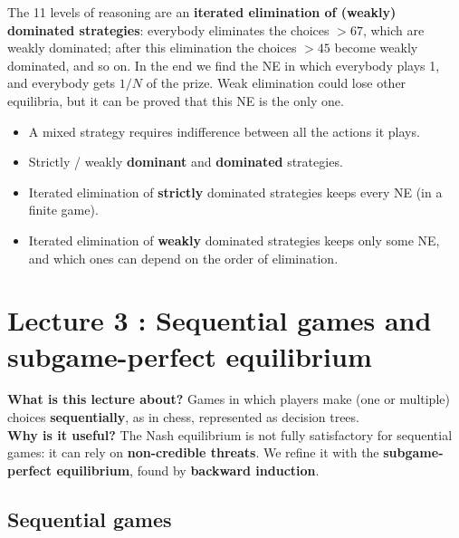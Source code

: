 \documentclass[11pt,a4paper,openany]{book}
\begin{document}
\begin{propbox}[title=Beauty Contest and iterated elimination]
The 11 levels of reasoning are an \textbf{iterated elimination of (weakly) dominated
strategies}: everybody eliminates the choices $> 67$, which are weakly dominated; after this
elimination the choices $> 45$ become weakly dominated, and so on. In the end we find the NE
in which everybody plays 1, and everybody gets $1/N$ of the prize. Weak elimination could
lose other equilibria, but it can be proved that this NE is the only one.
\end{propbox}

\begin{keybox}[title=Summary]
\begin{itemize}
  \item A mixed strategy requires indifference between all the actions it plays.
  \item Strictly / weakly \textbf{dominant} and \textbf{dominated} strategies.
  \item Iterated elimination of \textbf{strictly} dominated strategies keeps every NE (in a
        finite game).
  \item Iterated elimination of \textbf{weakly} dominated strategies keeps only some NE, and
        which ones can depend on the order of elimination.
\end{itemize}
\end{keybox}


\chapter{Lecture 3 : Sequential games and subgame-perfect equilibrium}

\begin{rembox}[title=In a nutshell]
\textbf{What is this lecture about?} Games in which players make (one or multiple) choices
\textbf{sequentially}, as in chess, represented as decision trees. \\
\textbf{Why is it useful?} The Nash equilibrium is not fully satisfactory for sequential
games: it can rely on \textbf{non-credible threats}. We refine it with the
\textbf{subgame-perfect equilibrium}, found by \textbf{backward induction}.
\end{rembox}

\section{Sequential games}
\end{document}
